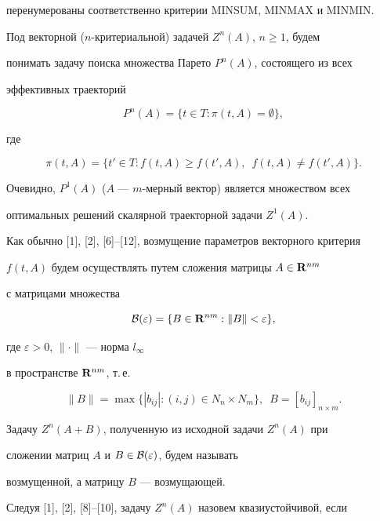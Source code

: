 перенумерованы соответственно критерии MINSUM, MINMAX и MINMIN.





Под векторной ($n$-критериальной) задачей $Z^{n}(A)$, $n\ge 1$, будем


понимать задачу поиска множества Парето $ P^{n}(A) $, состоящего из всех


эффективных траекторий


$$


P^n(A)=\{t\in T: \pi(t,A)=\emptyset\},


$$


где


$$


\pi(t,A)=\{t'\in T: f(t,A)\geq f(t',A) ,\ \; f(t,A)\ne f(t',A)\}.


$$


Очевидно, $P^1(A)$ ($A$ --- $m$-мерный вектор) является множеством всех


оптимальных решений скалярной траекторной задачи $Z^1(A)$.





Как обычно [1], [2], [6]--[12], возмущение параметров векторного критерия


$f(t,A)$ будем осуществлять путем сложения матрицы $A\in {\bold R}^{nm}$


с матрицами множества


$$


{\cal B}(\varepsilon)=\{ B \in \bold R^{nm}: \| B\| < \varepsilon\},


$$


где $\varepsilon>0$, $\|\cdot\|$ --- норма $l_{\infty}$


в пространстве ${\bold R}^{nm}$, т.\,е.


$$


\| B \| =\max\{|b_{ij}|: (i,j)\in N_{n}


\times N_{m}\},\ \; B=[ b_{ij}]_{n\times m}.


$$





Задачу $Z^n(A+B)$, полученную из исходной задачи $Z^n(A)$ при


сложении матриц $A$ и $B\in {\cal B}(\varepsilon)$, будем называть


возмущенной, а матрицу $B$ --- возмущающей.





Следуя [1], [2], [8]--[10], задачу $ Z^n(A)$ назовем квазиустойчивой, если


